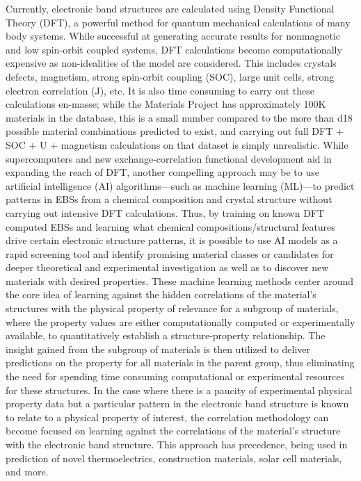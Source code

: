\documentclass[article]{elsarticle}
\begin{document}
Currently, electronic band structures are calculated using Density Functional Theory (DFT), a powerful method for quantum mechanical calculations of many body systems. While successful at generating accurate results for nonmagnetic and low spin-orbit coupled systems, DFT calculations become computationally expensive as non-idealities of the model are considered. This includes crystals defects, magnetism, strong spin-orbit coupling (SOC), large unit cells, strong electron correlation (J), etc. It is also time consuming to carry out these calculations en-masse; while the Materials Project\cite{ward2018matminer} has approximately 100K materials in the database, this is a small number compared to the more than \num{d18} possible material combinations predicted to exist, and carrying out full DFT + SOC + U + magnetism calculations on that dataset is simply unrealistic. While supercomputers and new exchange-correlation functional development aid in expanding the reach of DFT, another compelling approach may be to use artificial intelligence (AI) algorithms---such as machine learning (ML)---to predict patterns in EBSs from a chemical composition and crystal structure without carrying out intensive DFT calculations. Thus, by training on known DFT computed EBSs and learning what chemical compositions/structural features drive certain electronic structure patterns, it is possible to use AI models as a rapid screening tool and identify promising material classes or candidates for deeper theoretical and experimental investigation as well as to discover new materials with desired properties. These machine learning methods center around the core idea of learning against the hidden correlations of the material's structures with the physical property of relevance for a subgroup of materials, where the property values are either computationally computed or experimentally available, to quantitatively establish a structure-property relationship. The insight gained from the subgroup of materials is then utilized to deliver predictions on the property for all materials in the parent group, thus eliminating the need for spending time consuming computational or experimental resources for these structures.\cite{moghadam2019structure,sun2019machine,zhou2019big,goldsmith2018machine,toyao2019machine} In the case where there is a paucity of experimental physical property data but a particular pattern in the electronic band structure is known to relate to a physical property of interest, the correlation methodology can become focused on learning against the correlations of the material's structure with the electronic band structure. This approach has precedence, being used in prediction of novel thermoelectrics,\cite{JiaXue2022,NaGyoungS2021,ShengYe2020} construction materials,\cite{MASOODCHAUDRY2021101897} solar cell materials,\cite{ChoudharyKamal2019,doi:10.1021/acs.jpclett.1c03526} and more. 
\end{document}
